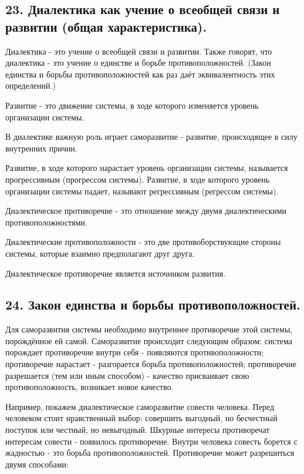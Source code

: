 \documentclass[a4paper, 12pt]{article}
\begin{document}
\subsection*{\textbf{23. Диалектика как учение о всеобщей связи и развитии (общая характеристика).}}

Диалектика - это учение о всеобщей связи и развитии.
Также говорят, что диалектика - это учение о единстве и борьбе противоположностей.
(Закон единства и борьбы противоположностей как раз даёт эквивалентность этих определений.)

Развитие - это движение системы, в ходе которого изменяется уровень организации системы.

В диалектике важную роль играет саморазвитие - развитие, происходящее в силу внутренних причин.

Развитие, в ходе которого нарастает уровень организации системы, называется прогрессивным (прогрессом системы).
Развитие, в ходе которого уровень организации системы падает, называют регрессивным (регрессом системы).

Диалектическое противоречие - это отношение между двумя диалектическими противоположностями.

Диалектические противоположности - это две противоборствующие стороны системы, которые взаимно предполагают друг друга.

Диалектическое противоречие является источником развития.


\subsection*{\textbf{24. Закон единства и борьбы противоположностей.}}

Для саморазвития системы необходимо внутреннее противоречие этой системы, порождённое ей самой.
Саморазвитие происходит следующим образом:
система порождает противоречие внутри себя - появляются противоположности;
противоречие нарастает - разгорается борьба противоположностей;
противоречие разрешается (тем или иным способом) - качество присваивает свою противоположность, возникает новое качество.

Например, покажем диалектическое саморазвитие совести человека.
Перед человеком стоит нравственный выбор: совершить выгодный, но бесчестный поступок или честный, но невыгодный.
Шкурные интересы противоречат интересам совести - появилось противоречие.
Внутри человека совесть борется с жадностью - это борьба противоположностей.
Противоречие может разрешиться двумя способами:
\end{document}
